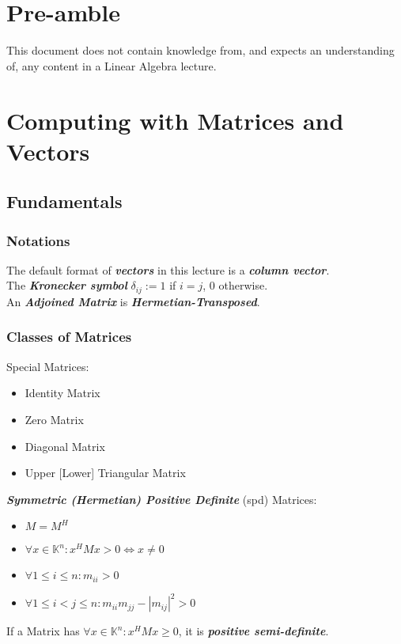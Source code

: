 \documentclass[12pt]{article}
\author{\authorVar}
\title{\titleVar}
\date{\dateVar}
\newcommand{\tocr}{
\renewcommand\cftaftertoctitle{\par\noindent\hrulefill\par\vskip-0.65em}
\tableofcontents
\noindent\hrulefill
}
\begin{document}
    
    
\maketitle

\tocr

\thispagestyle{fancy}
\section*{Pre-amble} %
This document does not contain knowledge from, and expects an understanding of, any content in a Linear Algebra lecture.
\section{Computing with Matrices and Vectors}
\subsection{Fundamentals}
\subsubsection{Notations}
The default format of \textit{\textbf{vectors}} in this lecture is a \textit{\textbf{column vector}}.\\
The \textit{\textbf{Kronecker symbol}} $\delta_{ij} := 1$ if $i=j$, 0 otherwise.\\
An \textit{\textbf{Adjoined Matrix}} is \textit{\textbf{Hermetian-Transposed}}.
\subsubsection{Classes of Matrices}
Special Matrices:
\begin{itemize}
\item Identity Matrix
\item Zero Matrix
\item Diagonal Matrix
\item Upper [Lower] Triangular Matrix
\end{itemize}
\textit{\textbf{Symmetric (Hermetian) Positive Definite}} (spd) Matrices:
\begin{itemize}
\item $M = M^H$
\item $\forall x \in \mathbb{K}^n: x^HMx > 0 \iff x \neq 0$
\item $\forall 1 \leq i \leq n : m_{ii} > 0$
\item $\forall 1 \leq i < j \leq n: m_{ii}m_{jj} - |m_{ij}|^2 > 0$
\end{itemize}
If a Matrix has $\forall x \in \mathbb{K}^n: x^HMx \geq 0$, it is \textit{\textbf{positive semi-definite}}.
\end{document}
